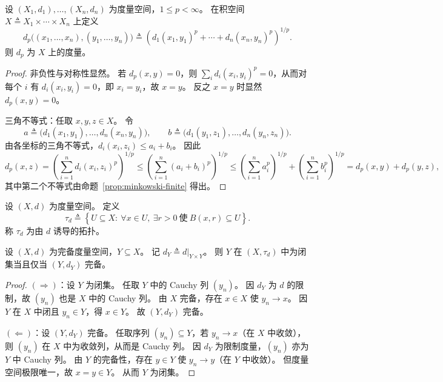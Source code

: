 \documentclass[lang=cn,a4paper,newtx,section]{elegantbook}
\begin{document}
\begin{proposition}\label{prop:product-metric-dp}
  设 $(X_1,d_1),\dots,(X_n,d_n)$ 为度量空间，$1\le p<\infty$。
  在积空间 $X\triangleq X_1\times\cdots\times X_n$ 上定义
  \[
    d_p\bigl((x_1,\dots,x_n),(y_1,\dots,y_n)\bigr)
    \triangleq\left(d_1(x_1,y_1)^p+\cdots+d_n(x_n,y_n)^p\right)^{1/p}.
  \]
  则 $d_p$ 为 $X$ 上的度量。
\end{proposition}

\begin{proof}
  非负性与对称性显然。
  若 $d_p(x,y)=0$，则 $\sum_i d_i(x_i,y_i)^p=0$，从而对每个 $i$ 有 $d_i(x_i,y_i)=0$，即 $x_i=y_i$，故 $x=y$。
  反之 $x=y$ 时显然 $d_p(x,y)=0$。

  三角不等式：任取 $x,y,z\in X$。
  令
  \[
    a\triangleq\bigl(d_1(x_1,y_1),\dots,d_n(x_n,y_n)\bigr),\qquad
    b\triangleq\bigl(d_1(y_1,z_1),\dots,d_n(y_n,z_n)\bigr).
  \]
  由各坐标的三角不等式，$d_i(x_i,z_i)\le a_i+b_i$。
  因此
  \[
    d_p(x,z)
    =\left(\sum_{i=1}^{n}d_i(x_i,z_i)^p\right)^{1/p}
    \le\left(\sum_{i=1}^{n}(a_i+b_i)^p\right)^{1/p}
    \le\left(\sum_{i=1}^{n}a_i^p\right)^{1/p}+\left(\sum_{i=1}^{n}b_i^p\right)^{1/p}
    =d_p(x,y)+d_p(y,z),
  \]
  其中第二个不等式由命题~\ref{prop:minkowski-finite} 得出。
\end{proof}

\begin{definition}
  设 $(X,d)$ 为度量空间。
  定义
  \[
    \tau_d\triangleq\left\{U\subseteq X:\ \forall x\in U,\ \exists r>0\ \text{使}\ B(x,r)\subseteq U\right\}.
  \]
  称 $\tau_d$ 为由 $d$ 诱导的拓扑。
\end{definition}

\begin{theorem}\label{thm:complete-subset-closed}
  设 $(X,d)$ 为完备度量空间，$Y\subseteq X$。
  记 $d_Y\triangleq d|_{Y\times Y}$。
  则 $Y$ 在 $(X,\tau_d)$ 中为闭集当且仅当 $(Y,d_Y)$ 完备。
\end{theorem}

\begin{proof}
  $(\Rightarrow)$：设 $Y$ 为闭集。
  任取 $Y$ 中的 Cauchy 列 $(y_n)$。
  因 $d_Y$ 为 $d$ 的限制，故 $(y_n)$ 也是 $X$ 中的 Cauchy 列。
  由 $X$ 完备，存在 $x\in X$ 使 $y_n\to x$。
  因 $Y$ 在 $X$ 中闭且 $y_n\in Y$，得 $x\in Y$。
  故 $(Y,d_Y)$ 完备。

  $(\Leftarrow)$：设 $(Y,d_Y)$ 完备。
  任取序列 $(y_n)\subseteq Y$，若 $y_n\to x$（在 $X$ 中收敛），则 $(y_n)$ 在 $X$ 中为收敛列，从而是 Cauchy 列。
  因 $d_Y$ 为限制度量，$(y_n)$ 亦为 $Y$ 中 Cauchy 列。
  由 $Y$ 的完备性，存在 $y\in Y$ 使 $y_n\to y$（在 $Y$ 中收敛）。
  但度量空间极限唯一，故 $x=y\in Y$。
  从而 $Y$ 为闭集。
\end{proof}
\end{document}
